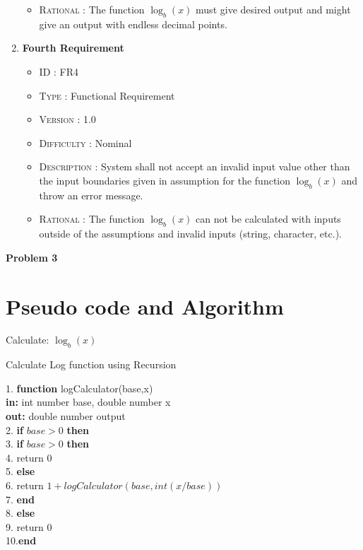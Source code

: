 \documentclass[a4paper, 11pt]{article}
\begin{document}
\begin{enumerate}
\begin{itemize}
        \item \textsc{Rational : }The function $\log _b \left( x \right)$ must give desired output and might give an output with endless decimal points.
    \end{itemize}
\newpage
    \item\textbf{Fourth  Requirement}
    \begin{itemize}
        \item \textsc{ID : }FR4
        \item \textsc{Type : }Functional Requirement
        \item \textsc{Version : }1.0
        \item \textsc{Difficulty : }Nominal
        \item \textsc{Description : }System shall not accept an invalid input value other than the input boundaries given in assumption for the function $\log _b \left( x \right)$ and throw an error message.
        \item \textsc{Rational : }The function $\log _b \left( x \right)$ can not be calculated with inputs outside of the assumptions and invalid inputs (string, character, etc.).
    \end{itemize}
    \end{enumerate}

\newpage
\large\textbf{Problem 3}
\section*{Pseudo code and Algorithm}
Calculate: $\log _b \left( x \right)$
\begin{algorithm}
\caption{Calculate Log function using Recursion}
\begin{algorithmic}
1. \textbf{function} logCalculator(base,x)\\
\textbf{in: } int number base, double number x\\
\textbf{out: } double number output\\
2.  \textbf{if}  \STATE $base > 0$  \textbf{then}\\
3. \qquad\STATE \textbf{if} $base > 0$  \textbf{then}\\
4. \qquad\qquad \STATE return $0$\\
5. \qquad\STATE \textbf{else}\\
6. \qquad\qquad \STATE return $1+logCalculator(base,int(x/base))$\\
7. \qquad\STATE \textbf{end}\\
8. \STATE \textbf{else}\\
9. \qquad\STATE return $0$\\
10.\STATE \textbf{end}\\
\end{algorithmic}
\end{algorithm}
\end{document}
